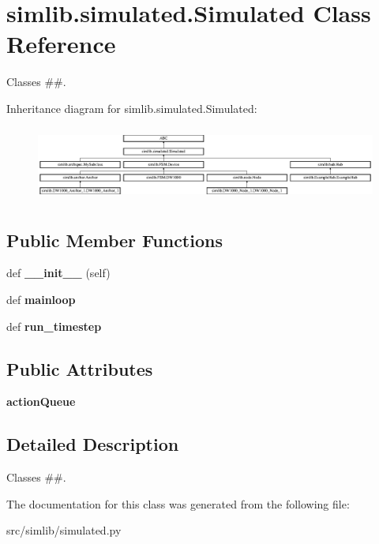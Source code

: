 \hypertarget{classsimlib_1_1simulated_1_1_simulated}{}\section{simlib.\+simulated.\+Simulated Class Reference}
\label{classsimlib_1_1simulated_1_1_simulated}


Classes \#\#.  


Inheritance diagram for simlib.\+simulated.\+Simulated\+:\begin{figure}[H]
\begin{center}
\leavevmode
\includegraphics[height=2.491103cm]{classsimlib_1_1simulated_1_1_simulated}
\end{center}
\end{figure}
\subsection*{Public Member Functions}
\begin{DoxyCompactItemize}
\item 
\mbox{\label{classsimlib_1_1simulated_1_1_simulated_aeb8d4e3ec653925db07aa4a13f128b0b}} 
def {\bfseries \+\_\+\+\_\+init\+\_\+\+\_\+} (self)
\item 
\mbox{\label{classsimlib_1_1simulated_1_1_simulated_aef913462bcf40e1a2515fdc6f84ef8a4}} 
def {\bfseries mainloop}
\item 
\mbox{\label{classsimlib_1_1simulated_1_1_simulated_a33d6b8f120ac2a359c8ea9b4a293967d}} 
def {\bfseries run\+\_\+timestep}
\end{DoxyCompactItemize}
\subsection*{Public Attributes}
\begin{DoxyCompactItemize}
\item 
\mbox{\label{classsimlib_1_1simulated_1_1_simulated_ae6258c72199dbdda082683c39a7dc336}} 
{\bfseries action\+Queue}
\end{DoxyCompactItemize}


\subsection{Detailed Description}
Classes \#\#. 

The documentation for this class was generated from the following file\+:\begin{DoxyCompactItemize}
\item 
src/simlib/simulated.\+py\end{DoxyCompactItemize}
